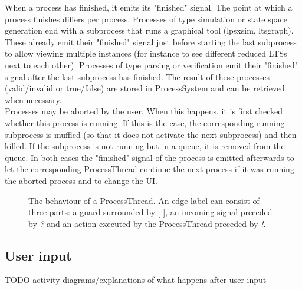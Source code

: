 \documentclass[a4paper, fleqn]{article}
\begin{document}
When a process has finished, it emits its "finished" signal. The point at which a process finishes differs per process. Processes of type simulation or state space generation end with a subprocess that runs a graphical tool (lpsxsim, ltsgraph). These already emit their "finished" signal just before starting the last subprocess to allow viewing multiple instances (for instance to see different reduced LTSs next to each other). Processes of type parsing or verification emit their "finished" signal after the last subprocess has finished. The result of these processes (valid/invalid or true/false) are stored in ProcessSystem and can be retrieved when necessary.\\
Processes may be aborted by the user. When this happens, it is first checked whether this process is running. If this is the case, the corresponding running subprocess is muffled (so that it does not activate the next subprocess) and then killed. If the subprocess is not running but in a queue, it is removed from the queue. In both cases the "finished" signal of the process is emitted afterwards to let the corresponding ProcessThread continue the next process if it was running the aborted process and to change the UI.

\begin{figure}[b!]
\centering
{}
\caption{The behaviour of a ProcessThread. An edge label can consist of three parts: a guard surrounded by [ ], an incoming signal preceded by \textit{?} and an action executed by the ProcessThread preceded by \textit{!}.}
\label{procthread}
\end{figure}


\subsection{User input}
TODO activity diagrams/explanations of what happens after user input
\end{document}
